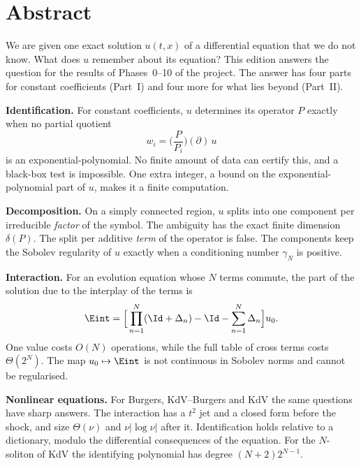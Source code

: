 \chapter*{Abstract}

We are given one exact solution $u(t,x)$ of a differential equation that we do not know. What does $u$ remember about its equation? This edition answers the question for the results of Phases~0--10 of the project. The answer has four parts for constant coefficients (Part~I) and four more for what lies beyond (Part~II).

\textbf{Identification.} For constant coefficients, $u$ determines its operator $P$ exactly when no partial quotient
\[
w_i=\Big(\frac{P}{P_i}\Big)(\partial)\,u
\]
is an exponential-polynomial. No finite amount of data can certify this, and a black-box test is impossible. One extra integer, a bound on the exponential-polynomial part of $u$, makes it a finite computation.

\textbf{Decomposition.} On a simply connected region, $u$ splits into one component per irreducible \emph{factor} of the symbol. The ambiguity has the exact finite dimension $\delta(P)$. The split per additive \emph{term} of the operator is false. The components keep the Sobolev regularity of $u$ exactly when a conditioning number $\gamma_N$ is positive.

\textbf{Interaction.} For an evolution equation whose $N$ terms commute, the part of the solution due to the interplay of the terms is
\[
\Eint=\Big[\prod_{n=1}^N(\Id+\Delta_n)-\Id-\sum_{n=1}^N\Delta_n\Big]u_0 .
\]
One value costs $O(N)$ operations, while the full table of cross terms costs $\Theta(2^N)$. The map $u_0\mapsto\Eint$ is not continuous in Sobolev norms and cannot be regularised.

\textbf{Nonlinear equations.} For Burgers, KdV--Burgers and KdV the same questions have sharp answers. The interaction has a $t^2$ jet and a closed form before the shock, and size $\Theta(\nu)$ and $\nu|\log\nu|$ after it. Identification holds relative to a dictionary, modulo the differential consequences of the equation. For the $N$-soliton of KdV the identifying polynomial has degree $(N+2)2^{N-1}$.

